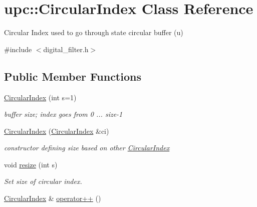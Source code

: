 \hypertarget{classupc_1_1CircularIndex}{}\section{upc\+:\+:Circular\+Index Class Reference}
\label{classupc_1_1CircularIndex}


Circular Index used to go through state circular buffer (u)  




{\ttfamily \#include $<$digital\+\_\+filter.\+h$>$}

\subsection*{Public Member Functions}
\begin{DoxyCompactItemize}
\item 
\hyperlink{classupc_1_1CircularIndex_a80c03ec94380d80132ca01b39ef9b0e7}{Circular\+Index} (int s=1)
\begin{DoxyCompactList}\small\item\em buffer size; index goes from 0 ... size-\/1 \end{DoxyCompactList}\item 
\mbox{\label{classupc_1_1CircularIndex_abca2976e157594a74d4aa1c06b0c4c2e}} 
\hyperlink{classupc_1_1CircularIndex_abca2976e157594a74d4aa1c06b0c4c2e}{Circular\+Index} (\hyperlink{classupc_1_1CircularIndex}{Circular\+Index} \&ci)
\begin{DoxyCompactList}\small\item\em constructor defining size based on other \hyperlink{classupc_1_1CircularIndex}{Circular\+Index} \end{DoxyCompactList}\item 
\mbox{\label{classupc_1_1CircularIndex_aa8bfc28723ab87c1ab66262843aac2a5}} 
void \hyperlink{classupc_1_1CircularIndex_aa8bfc28723ab87c1ab66262843aac2a5}{resize} (int s)
\begin{DoxyCompactList}\small\item\em Set size of circular index. \end{DoxyCompactList}\item 
\mbox{\label{classupc_1_1CircularIndex_a8c02bb1020495ad418f1c0770a03a9f6}} 
\hyperlink{classupc_1_1CircularIndex}{Circular\+Index} \& \hyperlink{classupc_1_1CircularIndex_a8c02bb1020495ad418f1c0770a03a9f6}{operator++} ()

\end{DoxyCompactItemize}
